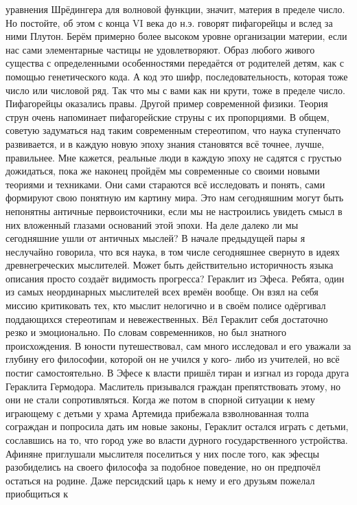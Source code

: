 уравнения Шрёдингера для волновой функции, значит, материя в пределе число. Но
постойте, об этом с конца VI века до н.э. говорят пифагорейцы и вслед за ними
Плутон. Берём примерно более высоком уровне организации материи, если нас сами
элементарные частицы не удовлетворяют. Образ любого живого существа с
определенными особенностями передаётся от родителей детям, как с помощью
генетического кода. А код это шифр, последовательность, которая тоже число или
числовой ряд. Так что мы с вами как ни крути, тоже в пределе число. Пифагорейцы
оказались правы. Другой пример современной физики. Теория струн очень напоминает
пифагорейские струны с их пропорциями. В общем, советую задуматься над таким
современным стереотипом, что наука ступенчато развивается, и в каждую новую
эпоху знания становятся всё точнее, лучше, правильнее. Мне кажется, реальные
люди в каждую эпоху не садятся с грустью дожидаться, пока же наконец пройдём мы
современные со своими новыми теориями и техниками. Они сами стараются всё
исследовать и понять, сами формируют свою понятную им картину мира. Это нам
сегодняшним могут быть непонятны античные первоисточники, если мы не настроились
увидеть смысл в них вложенный глазами оснований этой эпохи. На деле далеко ли мы
сегодняшние ушли от античных мыслей? В начале предыдущей пары я неслучайно
говорила, что вся наука, в том числе сегодняшнее свернуто в идеях
древнегреческих мыслителей. Может быть действительно историчность языка описания
просто создаёт видимость прогресса? Гераклит из Эфеса. Ребята, один из самых
неординарных мыслителей всех времён вообще. Он взял на себя миссию критиковать
тех, кто мыслит нелогично и в своём полисе одёргивал поддающихся стереотипам и
невежественных. Вёл Гераклит себя достаточно резко и эмоционально. По словам
современников, но был знатного происхождения. В юности путешествовал, сам много
исследовал и его уважали за глубину его философии, которой он не учился у кого-
либо из учителей, но всё постиг самостоятельно. В Эфесе к власти пришёл тиран и
изгнал из города друга Гераклита Гермодора. Маслитель призывался граждан
препятствовать этому, но они не стали сопротивляться. Когда же потом в спорной
ситуации к нему играющему с детьми у храма Артемида прибежала взволнованная
толпа сограждан и попросила дать им новые законы, Гераклит остался играть с
детьми, сославшись на то, что город уже во власти дурного государственного
устройства. Афиняне приглушали мыслителя поселиться у них после того, как эфесцы
разобиделись на своего философа за подобное поведение, но он предпочёл остаться
на родине. Даже персидский царь к нему и его друзьям пожелал приобщиться к
